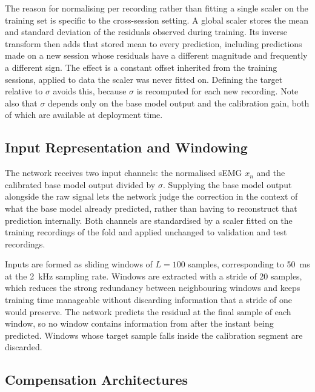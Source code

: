 The reason for normalising per recording rather than fitting a single scaler on
the training set is specific to the cross-session setting. A global scaler stores
the mean and standard deviation of the residuals observed during training. Its
inverse transform then adds that stored mean to every prediction, including
predictions made on a new session whose residuals have a different magnitude and
frequently a different sign. The effect is a constant offset inherited from the
training sessions, applied to data the scaler was never fitted on. Defining the
target relative to $\sigma$ avoids this, because $\sigma$ is recomputed for each
new recording. Note also that $\sigma$ depends only on the base model output and
the calibration gain, both of which are available at deployment time.

\subsection{Input Representation and Windowing}
\label{sec:inputs}

The network receives two input channels: the normalised sEMG $x_n$ and the
calibrated base model output divided by $\sigma$. Supplying the base model output
alongside the raw signal lets the network judge the correction in the context of
what the base model already predicted, rather than having to reconstruct that
prediction internally. Both channels are standardised by a scaler fitted on the
training recordings of the fold and applied unchanged to validation and test
recordings.

Inputs are formed as sliding windows of $L = 100$ samples, corresponding to
\SI{50}{\milli\second} at the \SI{2}{\kilo\hertz} sampling rate. Windows are
extracted with a stride of 20 samples, which reduces the strong redundancy
between neighbouring windows and keeps training time manageable without
discarding information that a stride of one would preserve. The network predicts
the residual at the final sample of each window, so no window contains
information from after the instant being predicted. Windows whose target sample
falls inside the calibration segment are discarded.

\subsection{Compensation Architectures}
\label{sec:models}

